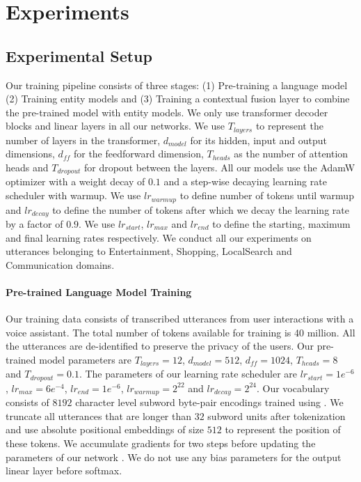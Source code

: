 \documentclass{article}
\begin{document}
\section{Experiments}
\label{experiments}

\subsection{Experimental Setup}

Our training pipeline consists of three stages: (1) Pre-training a language model (2) Training entity models and (3) Training a contextual fusion layer to combine the pre-trained model with entity models. We only use transformer decoder blocks \citep{NIPS2017_3f5ee243} and linear layers in all our networks. We use $T_{layers}$ to represent the number of layers in the transformer, $d_{model}$ for its hidden, input and output dimensions, $d_{ff}$ for the feedforward dimension, $T_{heads}$ as the number of attention heads and $T_{dropout}$ for dropout between the layers. All our models use the AdamW optimizer \citep{conf/iclr/LoshchilovH19} with a weight decay of $0.1$ and a step-wise decaying learning rate scheduler \citep{NEURIPS2019_2f4059ce} with warmup. We use $lr_{warmup}$ to define number of tokens until warmup and $lr_{decay}$ to define the number of tokens after which we decay the learning rate by a factor of $0.9$. We use $lr_{start}$, $lr_{max}$ and $lr_{end}$ to define the starting, maximum and final learning rates respectively. We conduct all our experiments on utterances belonging to Entertainment, Shopping, LocalSearch and Communication domains. 


\paragraph{Pre-trained Language Model Training} Our training data consists of transcribed utterances from user interactions with a voice assistant. The total number of tokens available for training is 40 million. All the utterances are de-identified to preserve the privacy of the users. Our pre-trained model parameters are $T_{layers} = 12$,  $d_{model} = 512$, $d_{ff} = 1024$, $T_{heads} = 8$ and $T_{dropout} = 0.1$. The parameters of our learning rate scheduler are $lr_{start} = 1e^{-6}$, $lr_{max} = 6e^{-4}$, $lr_{end} = 1e^{-6}$, $lr_{warmup} = 2^{22}$ and $lr_{decay} = 2^{24}$. Our vocabulary consists of $8192$ character level subword byte-pair encodings trained using \cite{sennrich-etal-2016-neural}. We truncate all utterances that are longer than $32$ subword units after tokenization and use absolute positional embeddings of size $512$ to represent the position of these tokens. We accumulate gradients for two steps before updating the parameters of our network \cite{ott-etal-2018-scaling}. We do not use any bias parameters for the output linear layer before softmax.
\end{document}
